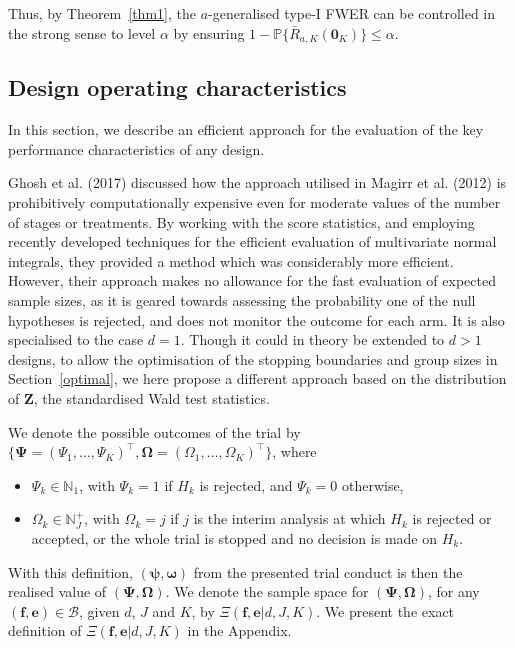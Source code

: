 \documentclass{article}
\numberwithin{equation}{section}
\theoremstyle{plain}
\begin{document}
Thus, by Theorem~\ref{thm1}, the $a$-generalised type-I FWER can be controlled in the strong sense to level $\alpha$ by ensuring $1-\mathbb{P}\{\bar{R}_{a,K}(\boldsymbol{0}_K)\}\le\alpha$.

\subsection{Design operating characteristics}\label{desdet}

In this section, we describe an efficient approach for the evaluation of the key performance characteristics of any design.

Ghosh et al. (2017) discussed how the approach utilised in Magirr et al. (2012) is prohibitively computationally expensive even for moderate values of the number of stages or treatments. By working with the score statistics, and employing recently developed techniques for the efficient evaluation of multivariate normal integrals, they provided a method which was considerably more efficient. However, their approach makes no allowance for the fast evaluation of expected sample sizes, as it is geared towards assessing the probability one of the null hypotheses is rejected, and does not monitor the outcome for each arm. It is also specialised to the case $d=1$. Though it could in theory be extended to $d>1$ designs, to allow the optimisation of the stopping boundaries and group sizes in Section~\ref{optimal}, we here propose a different approach based on the distribution of $\boldsymbol{Z}$, the standardised Wald test statistics.

We denote the possible outcomes of the trial by $\{\boldsymbol{\Psi}=(\Psi_1,\dots,\Psi_K)^\top,\boldsymbol{\Omega}=(\Omega_1,\dots,\Omega_K)^\top\}$, where
\begin{itemize}
	\item \(\Psi_k \in \mathbb{N}_1\), with \(\Psi_{k}=1\) if \(H_{k}\) is rejected, and \(\Psi_{k}=0\) otherwise,
	\item \(\Omega_{k} \in \mathbb{N}_J^+\), with \(\Omega_{k}=j\) if $j$ is the interim analysis at which $H_{k}$ is rejected or accepted, or the whole trial is stopped and no decision is made on $H_{k}$.
\end{itemize}
With this definition, $(\boldsymbol{\psi},\boldsymbol{\omega})$ from the presented trial conduct is then the realised value of $(\boldsymbol{\Psi},\boldsymbol{\Omega})$. We denote the sample space for $(\boldsymbol{\Psi},\boldsymbol{\Omega})$, for any $(\boldsymbol{f},\boldsymbol{e})\in\mathscr{B}$, given $d$, $J$ and $K$, by $\Xi(\boldsymbol{f},\boldsymbol{e}|d,J,K)$. We present the exact definition of $\Xi(\boldsymbol{f},\boldsymbol{e}|d,J,K)$ in the Appendix.
\end{document}

